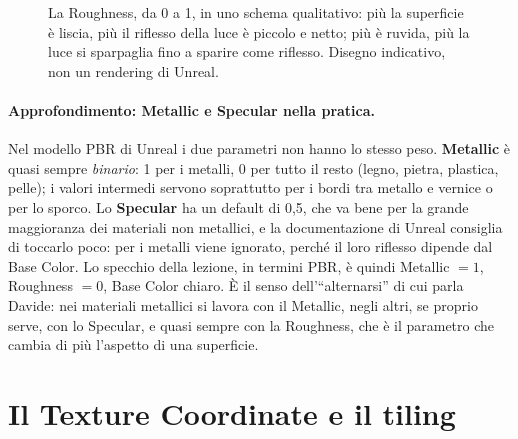 \begin{figure}[htbp]
\centering
{}
\caption{La Roughness, da 0 a 1, in uno schema qualitativo: più la superficie è liscia,
più il riflesso della luce è piccolo e netto; più è ruvida, più la luce si sparpaglia
fino a sparire come riflesso. Disegno indicativo, non un rendering di Unreal.}
\label{ue3:fig:roughness}
\end{figure}

\paragraph{Approfondimento: Metallic e Specular nella pratica.} Nel modello PBR di
Unreal i due parametri non hanno lo stesso peso. \textbf{Metallic} è quasi sempre
\emph{binario}: 1 per i metalli, 0 per tutto il resto (legno, pietra, plastica, pelle);
i valori intermedi servono soprattutto per i bordi tra metallo e vernice o per lo
sporco. Lo \textbf{Specular} ha un default di 0,5, che va bene per la grande maggioranza
dei materiali non metallici, e la documentazione di Unreal consiglia di toccarlo poco:
per i metalli viene ignorato, perché il loro riflesso dipende dal Base Color. Lo
specchio della lezione, in termini PBR, è quindi Metallic $=1$, Roughness $=0$, Base
Color chiaro. È il senso dell'``alternarsi'' di cui parla Davide: nei materiali metallici
si lavora con il Metallic, negli altri, se proprio serve, con lo Specular, e quasi
sempre con la Roughness, che è il parametro che cambia di più l'aspetto di una
superficie.

\section{Il Texture Coordinate e il tiling}
\label{ue3:sec:tiling}

